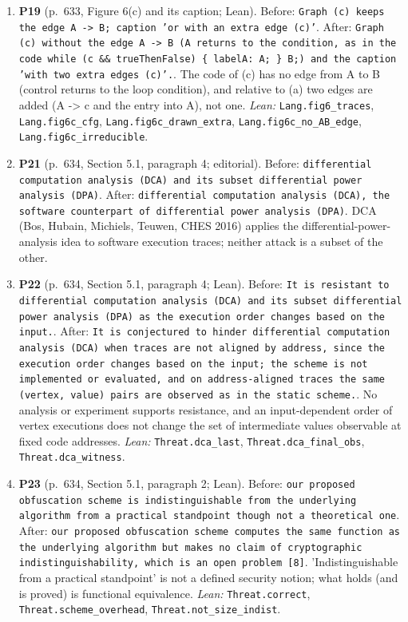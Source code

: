 \documentclass[9pt,twocolumn]{article}
\begin{document}
\begin{enumerate}[label=]
\item \textbf{P19} (p.~633, Figure 6(c) and its caption; Lean). Before: \texttt{Graph (c) keeps the edge A -> B; caption 'or with an extra edge (c)'}. After: \texttt{Graph (c) without the edge A -> B (A returns to the condition, as in the code while (c \&\& trueThenFalse) \{ labelA: A; \} B;) and the caption 'with two extra edges (c)'.}. The code of (c) has no edge from A to B (control returns to the loop condition), and relative to (a) two edges are added (A -> c and the entry into A), not one. \emph{Lean:} \texttt{Lang.fig6\_traces}, \texttt{Lang.fig6c\_cfg}, \texttt{Lang.fig6c\_drawn\_extra}, \texttt{Lang.fig6c\_no\_AB\_edge}, \texttt{Lang.fig6c\_irreducible}. 
\item \textbf{P21} (p.~634, Section 5.1, paragraph 4; editorial). Before: \texttt{differential computation analysis (DCA) and its subset differential power analysis (DPA)}. After: \texttt{differential computation analysis (DCA), the software counterpart of differential power analysis (DPA)}. DCA (Bos, Hubain, Michiels, Teuwen, CHES 2016) applies the differential-power-analysis idea to software execution traces; neither attack is a subset of the other. 
\item \textbf{P22} (p.~634, Section 5.1, paragraph 4; Lean). Before: \texttt{It is resistant to differential computation analysis (DCA) and its subset differential power analysis (DPA) as the execution order changes based on the input.}. After: \texttt{It is conjectured to hinder differential computation analysis (DCA) when traces are not aligned by address, since the execution order changes based on the input; the scheme is not implemented or evaluated, and on address-aligned traces the same (vertex, value) pairs are observed as in the static scheme.}. No analysis or experiment supports resistance, and an input-dependent order of vertex executions does not change the set of intermediate values observable at fixed code addresses. \emph{Lean:} \texttt{Threat.dca\_last}, \texttt{Threat.dca\_final\_obs}, \texttt{Threat.dca\_witness}. 
\item \textbf{P23} (p.~634, Section 5.1, paragraph 2; Lean). Before: \texttt{our proposed obfuscation scheme is indistinguishable from the underlying algorithm from a practical standpoint though not a theoretical one}. After: \texttt{our proposed obfuscation scheme computes the same function as the underlying algorithm but makes no claim of cryptographic indistinguishability, which is an open problem [8]}. 'Indistinguishable from a practical standpoint' is not a defined security notion; what holds (and is proved) is functional equivalence. \emph{Lean:} \texttt{Threat.correct}, \texttt{Threat.scheme\_overhead}, \texttt{Threat.not\_size\_indist}. 

\end{enumerate}
\end{document}
